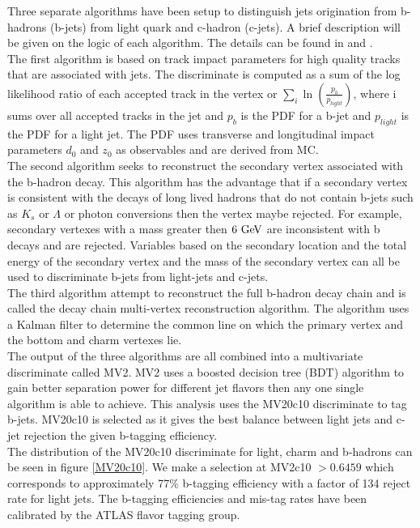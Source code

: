 \indent Three separate algorithms have been setup to distinguish jets origination from b-hadrons (b-jets) from light quark and c-hadron (c-jets).  A brief description will be given on the logic of each algorithm.  The details can be found in \cite{btagging2016}  and \cite{btagging2015}.  \\

\indent The first algorithm is based on track impact parameters for high quality tracks that are associated with jets.  The discriminate is computed as a sum of the log likelihood ratio of each accepted track in the vertex or $\sum_i \ln(\frac{p_b}{p_{light}})$, where i sums over all accepted tracks in the jet and $p_b$ is the PDF for a b-jet and $p_{light}$ is the PDF for a light jet.  The PDF uses transverse and longitudinal impact parameters $d_0$ and $z_0$ as observables and are derived from MC.  \\

\indent The second algorithm seeks to reconstruct the secondary vertex associated with the b-hadron decay.  This algorithm has the advantage that if a secondary vertex is consistent with the decays of long lived hadrons that do not contain b-jets such as $K_s$ or $\Lambda$ or photon conversions then the vertex maybe rejected.  For example, secondary vertexes with a mass greater then $6 \gev$ are inconsistent with b decays and are rejected. Variables based on the secondary location and the total energy of the secondary vertex and the mass of the secondary vertex can all be used to discriminate b-jets from light-jets and c-jets.  \\

\indent The third algorithm attempt to reconstruct the full b-hadron decay chain and is called the decay chain multi-vertex reconstruction algorithm.  The algorithm uses a Kalman filter to determine the common line on which the primary vertex and the bottom and charm vertexes lie.  \\

\indent The output of the three algorithms are all combined into a multivariate discriminate called MV2.  MV2 uses a boosted decision tree (BDT) algorithm \cite{TMVA} to gain better separation power for different jet flavors then any one single algorithm is able to achieve. This analysis uses the MV20c10 discriminate to tag b-jets. MV20c10 is selected as it gives the best balance between light jets and c-jet rejection the given b-tagging efficiency.  \\

\indent The distribution of the MV20c10 discriminate for light, charm and b-hadrons can be seen in figure \ref{MV20c10}. We make a selection at MV2c10 $ > 0.6459$ which corresponds to approximately 77\% b-tagging efficiency with a factor of 134 reject rate for light jets.  The b-tagging efficiencies and mis-tag rates have been calibrated by the ATLAS flavor tagging group.\\

